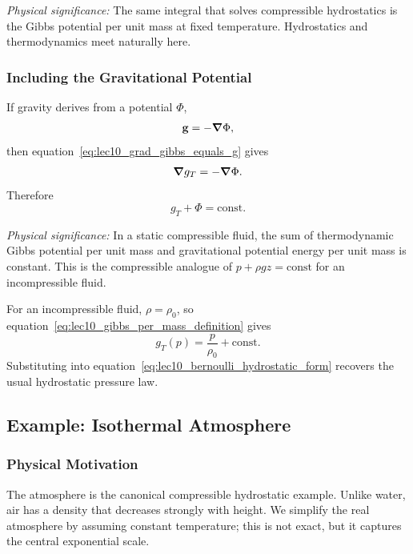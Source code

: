 \documentclass[../main.tex]{subfiles}
\begin{document}
\textit{Physical significance:} The same integral that solves compressible hydrostatics is the Gibbs potential per unit mass at fixed temperature. Hydrostatics and thermodynamics meet naturally here.

\subsubsection*{Including the Gravitational Potential}
If gravity derives from a potential $\Phi$,
\begin{equation}
  \mathbf{g}=-\grad\Phi,
  \label{eq:lec10_gravity_potential_definition}
\end{equation}
then equation~\eqref{eq:lec10_grad_gibbs_equals_g} gives
\begin{equation}
  \grad g_T=-\grad\Phi.
  \label{eq:lec10_gibbs_phi_gradient}
\end{equation}
Therefore
\begin{equation}
  \boxed{g_T+\Phi=\mathrm{const}.}
  \label{eq:lec10_bernoulli_hydrostatic_form}
\end{equation}

\textit{Physical significance:} In a static compressible fluid, the sum of thermodynamic Gibbs potential per unit mass and gravitational potential energy per unit mass is constant. This is the compressible analogue of $p+\rho g z=\mathrm{const}$ for an incompressible fluid.

For an incompressible fluid, $\rho=\rho_0$, so equation~\eqref{eq:lec10_gibbs_per_mass_definition} gives
\begin{equation}
  \boxed{g_T(p)=\frac{p}{\rho_0}+\mathrm{const}.}
  \label{eq:lec10_incompressible_gibbs}
\end{equation}
Substituting into equation~\eqref{eq:lec10_bernoulli_hydrostatic_form} recovers the usual hydrostatic pressure law.

\subsection{Example: Isothermal Atmosphere}\label{sec:lec10:isothermal-atmosphere}

\subsubsection*{Physical Motivation}
The atmosphere is the canonical compressible hydrostatic example. Unlike water, air has a density that decreases strongly with height. We simplify the real atmosphere by assuming constant temperature; this is not exact, but it captures the central exponential scale.
\end{document}
